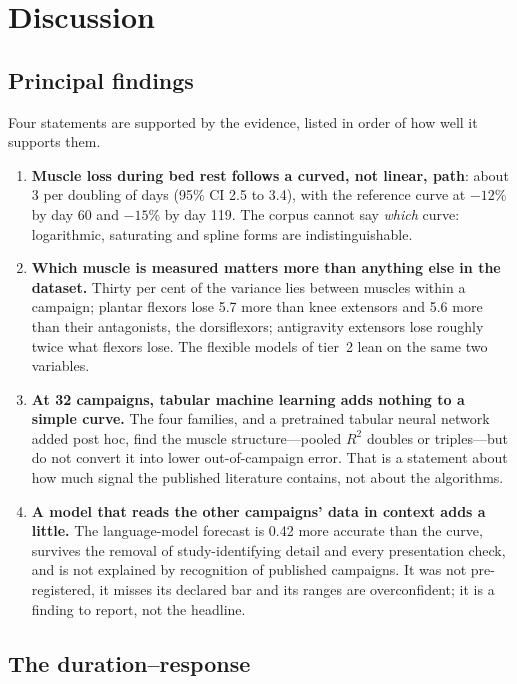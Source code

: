 \section{Discussion}
\label{sec:discussion}

\subsection{Principal findings}

Four statements are supported by the evidence, listed in order of how well it supports them.

\begin{enumerate}
  \item \textbf{Muscle loss during bed rest follows a curved, not linear, path}: about 3\pp{} per doubling of days
        (95\% CI 2.5 to 3.4), with the reference curve at $-12\%$ by day 60 and $-15\%$ by day 119. The corpus
        cannot say \emph{which} curve: logarithmic, saturating and spline forms are indistinguishable.
  \item \textbf{Which muscle is measured matters more than anything else in the dataset.} Thirty per cent of the
        variance lies between muscles within a campaign; plantar flexors lose 5.7\pp{} more than knee extensors
        and 5.6\pp{} more than their antagonists, the dorsiflexors; antigravity extensors lose roughly twice what
        flexors lose. The flexible models of tier~2 lean on the same two variables.
  \item \textbf{At 32 campaigns, tabular machine learning adds nothing to a simple curve.} The four families, and a
        pretrained tabular neural network added post hoc, find the muscle structure---pooled $R^2$ doubles or
        triples---but do not convert it into lower out-of-campaign error. That is a statement about how much signal
        the published literature contains, not about the algorithms.
  \item \textbf{A model that reads the other campaigns' data in context adds a little.} The language-model forecast
        is 0.42\pp{} more accurate than the curve, survives the removal of study-identifying detail and every
        presentation check, and is not explained by recognition of published campaigns. It was not pre-registered,
        it misses its declared bar and its ranges are overconfident; it is a finding to report, not the headline.
\end{enumerate}

\subsection{The duration--response}

